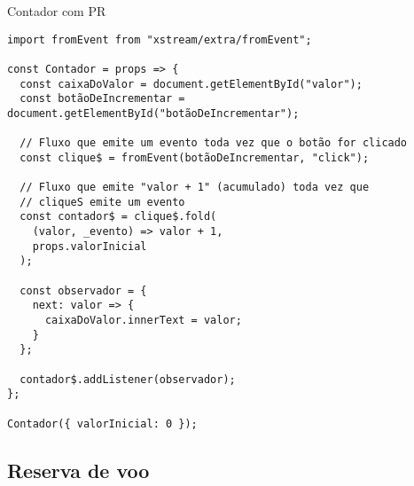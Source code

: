 \begin{listing}[htbp]
\caption{\label{code:contadorComPR}Contador com PR}
\begin{verbatim}
import fromEvent from "xstream/extra/fromEvent";

const Contador = props => {
  const caixaDoValor = document.getElementById("valor");
  const botãoDeIncrementar = document.getElementById("botãoDeIncrementar");

  // Fluxo que emite um evento toda vez que o botão for clicado
  const clique$ = fromEvent(botãoDeIncrementar, "click");

  // Fluxo que emite "valor + 1" (acumulado) toda vez que
  // cliqueS emite um evento
  const contador$ = clique$.fold(
    (valor, _evento) => valor + 1,
    props.valorInicial
  );

  const observador = {
    next: valor => {
      caixaDoValor.innerText = valor;
    }
  };

  contador$.addListener(observador);
};

Contador({ valorInicial: 0 });
\end{verbatim}
\end{listing}

\subsection{Reserva de voo}
\label{sec:org4238904}
